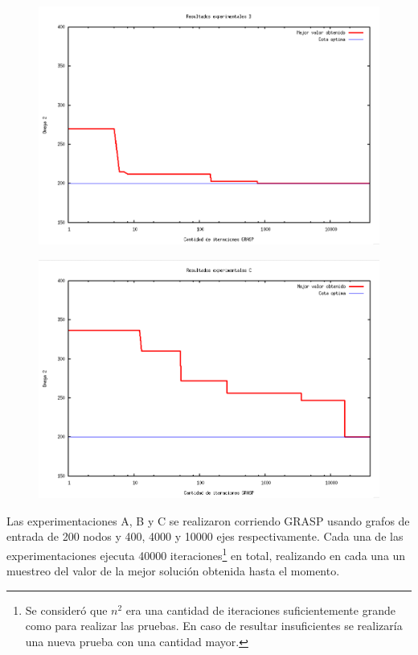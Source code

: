 \begin{figure}[H]
\begin{center}
\includegraphics[angle=0, scale=.5]{imagenes/iteraciones-GRASP-B.png}
\label{Resultados experimentales A}
\end{center}
\end{figure}

\begin{figure}[H]
\begin{center}
\includegraphics[angle=0, scale=.5]{imagenes/iteraciones-GRASP-C.png}
\label{Resultados experimentales C}
\end{center}
\end{figure}

Las experimentaciones A, B y C se realizaron corriendo GRASP usando grafos de entrada de 200 nodos y 400, 4000 y 10000 ejes respectivamente. Cada una de las experimentaciones ejecuta 40000 iteraciones\footnote{Se consideró que $n^2$ era una cantidad de iteraciones suficientemente grande como para realizar las pruebas. En caso de resultar insuficientes se realizaría una nueva prueba con una cantidad mayor.} en total, realizando en cada una un muestreo del valor de la mejor solución obtenida hasta el momento.


